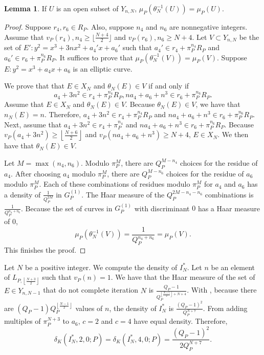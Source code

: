 \documentclass[12pt,letterpaper]{amsart}
\theoremstyle{definition}
\newtheorem{lemma}[theorem]{Lemma}
\begin{document}
\begin{lemma}
\label{invdensitysub1} If $U$ is an open subset of $Y_{n,N}$, $\mu_P(\theta_N^{-1}(U))=\mu_P(U)$.
\end{lemma}

\begin{proof}
Suppose $r_4, r_6\in R_P$. Also, suppose $n_4$ and $n_6$ are nonnegative integers. Assume that $v_P(r_4), n_4\geq\lfloor\frac{N+4}{2}\rfloor$ and $v_P(r_6), n_6\geq N+4$. Let $V\subset Y_{n,N}$ be the set of $E':y^2=x^3+3nx^2+a_4'x+a_6'$ such that $a_4'\in r_4+\pi_P^{n_4}R_P$ and $a_6'\in r_6+\pi_P^{n_6}R_P$. It suffices to prove that $\mu_P(\theta_N^{-1}(V))=\mu_P(V)$. Suppose $E: y^2=x^3+a_4x+a_6$ is an elliptic curve. 

We prove that that $E\in X_N$ and $\theta_N(E)\in V$ if and only if
\[
a_4+3n^2\in r_4+\pi_P^{n_4}R_P, na_4+a_6+n^3\in r_6+\pi_P^{n_6}R_P.
\]
Assume that $E\in X_N$ and $\theta_N(E)\in V$. Because $\theta_N(E)\in V$, we have that $n_N(E)=n$. Therefore, $a_4+3n^2\in r_4+\pi_P^{n_4}R_P$ and $na_4+a_6+n^3\in r_6+\pi_P^{n_6}R_P$. Next, assume that $a_4+3n^2\in r_4+\pi_P^{n_4}$ and $na_4+a_6+n^3\in r_6+\pi_P^{n_6}R_P$. Because $v_P(a_4+3n^2)\geq \left\lfloor\frac{N+6}{2}\right\rfloor$ and $v_P(na_4+a_6+n^3)\geq N+4$, $E\in X_N$. We then have that $\theta_N(E)\in V$.

Let $M=\max(n_4, n_6)$. Modulo $\pi_P^M$, there are $Q_P^{M-n_4}$ choices for the residue of $a_4$. After choosing $a_4$ modulo $\pi_P^M$, there are $Q_P^{M-n_6}$ choices for the residue of $a_6$ modulo $\pi_P^M$. Each of these combinations of residues modulo $\pi_P^M$ for $a_4$ and $a_6$ has a density of $\frac{1}{Q_P^{2M}}$ in $G_P^{(1)}$. The Haar measure of the $Q_P^{2M-n_4-n_6}$ combinations is $\frac{1}{Q_P^{n_4+n_6}}$. Because the set of curves in $G_P^{(1)}$ with discriminant $0$ has a Haar measure of $0$,
\[
\mu_P(\theta_N^{-1}(V)) = \frac{1}{Q_P^{n_4+n_6}} = \mu_P(V).
\]
This finishes the proof.
\end{proof}

Let $N$ be a positive integer. We compute the density of $I_N^*$. Let $n$ be an element of $L_{P, \left\lfloor\frac{N+3}{2}\right\rfloor}$ such that $v_P(n)=1$. We have that the Haar measure of the set of $E\in Y_{n,N-1}$ that do not complete iteration $N$ is $\frac{Q_P-1}{Q_P^{\left\lfloor\frac{N+5}{2}\right\rfloor+N+4}}$. With , because there are $(Q_P-1)Q_P^{\left\lfloor\frac{N-1}{2}\right\rfloor}$ values of $n$, the density of $I_N^*$ is $\frac{(Q_P-1)^2}{Q_P^{N+7}}$. From adding multiples of $\pi_P^{N+3}$ to $a_6$, $c=2$ and $c=4$ have equal density. Therefore,
\[
\delta_K(I_N^*, 2, 0; P) = \delta_K(I_N^*, 4, 0; P) = \frac{(Q_P-1)^2}{2Q_P^{N+7}}.
\]
\end{document}
